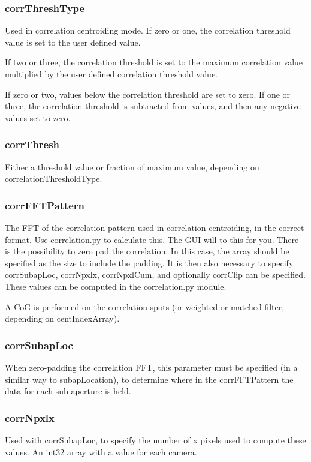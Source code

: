 \documentclass[a4,10pt]{article}
\begin{document}
\subsubsection{corrThreshType}
Used in correlation centroiding mode.
If zero or one, the correlation threshold value is set to
the user defined value.

If two or three, the correlation threshold is set to the maximum
correlation value multiplied by the user defined correlation threshold
value.

If zero or two, values below the correlation threshold are set to
zero.  If one or three, the correlation threshold is subtracted from
values, and then any negative values set to zero.

\subsubsection{corrThresh}
Either a threshold value or fraction of maximum value, depending on
correlationThresholdType.

\subsubsection{corrFFTPattern}
The FFT of the correlation pattern used in correlation centroiding, in
the correct format.  Use correlation.py to calculate this.  The GUI
will to this for you.  There is the possibility to zero pad the correlation.
In this case, the array should be specified as the size to include the
padding.  It is then also necessary to specify corrSubapLoc,
corrNpxlx, corrNpxlCum, and optionally corrClip can be specified.
These values can be computed in the correlation.py module.

A CoG is performed on the correlation spots (or weighted or matched
filter, depending on centIndexArray).

\subsubsection{corrSubapLoc}
When zero-padding the correlation FFT, this parameter must be
specified (in a similar way to subapLocation), to determine where in
the corrFFTPattern the data for each sub-aperture is held.  

\subsubsection{corrNpxlx}
Used with corrSubapLoc, to specify the number of x pixels used to
compute these values.  An int32 array with a value for each camera.
\end{document}
